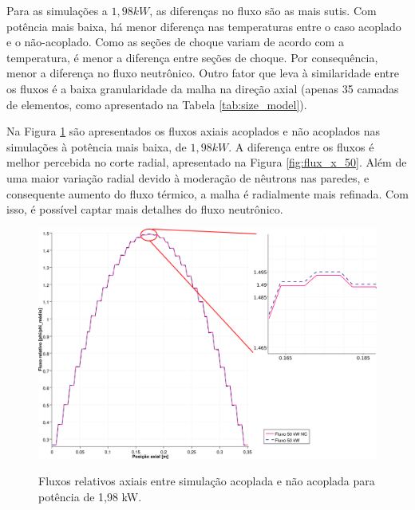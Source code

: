 Para as simulações a $1,98 kW$, as diferenças no fluxo são as mais sutis. Com potência mais baixa, há menor
diferença nas temperaturas entre o caso acoplado e o não-acoplado. Como as seções de choque variam de
acordo com a temperatura, é menor a diferença entre seções de choque. Por consequência, menor a diferença
no fluxo neutrônico. Outro fator que leva à similaridade entre os fluxos é a baixa granularidade
da malha na direção axial (apenas 35 camadas de elementos, como apresentado na Tabela \ref{tab:size_model}).

Na Figura \ref{fig:flux_z_50} são apresentados os fluxos axiais acoplados e não acoplados nas simulações
à potência mais baixa, de $1,98 kW$. A diferença entre os fluxos é melhor percebida no corte radial,
apresentado na Figura \ref{fig:flux_x_50}. Além de uma maior variação radial devido à moderação de nêutrons
nas paredes, e consequente aumento do fluxo térmico, a malha é radialmente mais refinada. Com isso, é possível
captar mais detalhes do fluxo neutrônico.


\begin{figure}[htb]
  \caption{Fluxos relativos axiais entre simulação acoplada e não acoplada para
    potência de 1,98 kW.}
  \centering\includegraphics[scale=0.6]{figuras/Flux_rel_z_50_port_trabalhado.png}
  \label{fig:flux_z_50}
\end{figure}


